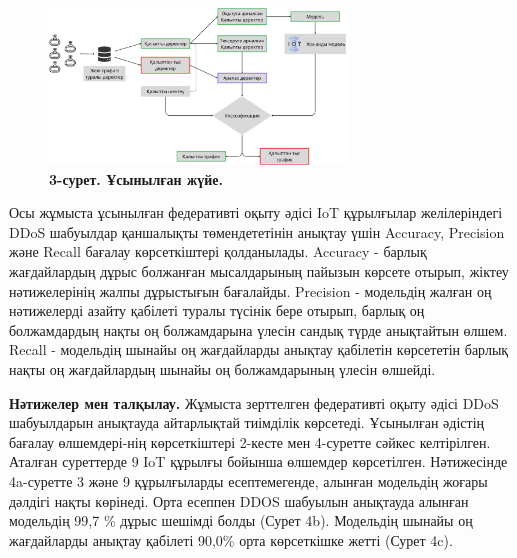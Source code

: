 \begin{figure}[H]
	\centering
	\includegraphics[width=0.7\textwidth]{assets/201}
	\caption*{\bfseries 3-сурет. Ұсынылған жүйе.}
\end{figure}

\begin{multicols}{2}


Осы жұмыста ұсынылған федеративті оқыту әдісі IoT құрылғылар
желілеріндегі DDoS шабуылдар қаншалықты төмендететінін анықтау үшін
Accuracy, Precision және Recall бағалау көрсеткіштері қолданылады.
Accuracy - барлық жағдайлардың дұрыс болжанған мысалдарының пайызын
көрсете отырып, жіктеу нәтижелерінің жалпы дұрыстығын бағалайды.
Precision - модельдің жалған оң нәтижелерді азайту қабілеті туралы
түсінік бере отырып, барлық оң болжамдардың нақты оң болжамдарына үлесін
сандық түрде анықтайтын өлшем. Recall - модельдің шынайы оң жағдайларды
анықтау қабілетін көрсететін барлық нақты оң жағдайлардың шынайы оң
болжамдарының үлесін өлшейді.

{\bfseries Нәтижелер мен талқылау.} Жұмыста зерттелген федеративті оқыту
әдісі DDoS шабуылдарын анықтауда айтарлықтай тиімділік көрсетеді.
Ұсынылған әдістің бағалау өлшемдері-нің көрсеткіштері 2-кесте мен
4-суретте сәйкес келтірілген. Аталған суреттерде 9 IoT құрылғы бойынша
өлшемдер көрсетілген. Нәтижесінде 4a-суретте 3 және 9 құрылғыларды
есептемегенде, алынған модельдің жоғары дәлдігі нақты көрінеді. Орта
есеппен DDOS шабуылын анықтауда алынған модельдің 99,7 \% дұрыс шешімді
болды (Сурет 4b). Модельдің шынайы оң жағдайларды анықтау қабілеті
90,0\% орта көрсеткішке жетті (Сурет 4c).
\end{multicols}

